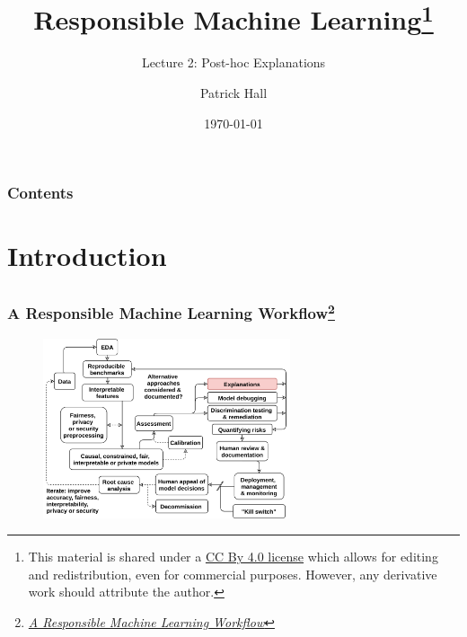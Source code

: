 \documentclass[11pt,aspectratio=169,hyperref={colorlinks}]{beamer}
\author{Patrick Hall}
\title{Responsible Machine Learning\footnote{\tiny{This material is shared under a \href{https://creativecommons.org/licenses/by/4.0/deed.ast}{CC By 4.0 license} which allows for editing and redistribution, even for commercial purposes. However, any derivative work should attribute the author.}}}
\subtitle{Lecture 2:  Post-hoc Explanations}
\institute{The George Washington University}
\date{\today}
\renewcommand*{\thefootnote}{\fnsymbol{footnote}}
\renewcommand*{\thefootnote}{\fnsymbol{footnote}}
\begin{document}
	
	\maketitle
	
	\begin{frame}
	
		\frametitle{Contents}
		
		\tableofcontents{}
		
	\end{frame}

\renewcommand*{\thefootnote}{\arabic{footnote}}

	\section{Introduction}

	
		\subsection*{} %
			
		\begin{frame}
		
			\frametitle{A Responsible Machine Learning Workflow\footnote{\href{https://www.mdpi.com/2078-2489/11/3/137/htm}{\textit{A Responsible Machine Learning Workflow}}}}
			
			\begin{figure}[htb]
				\begin{center}
					\includegraphics[height=150pt]{../img/rml_diagram_lec2_hilite.png}
					\label{fig:blueprint}
				\end{center}
			\end{figure}		
					
		\end{frame}					
\end{document}
